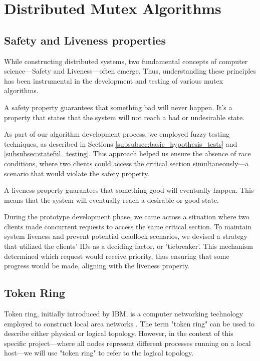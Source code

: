 \chapter{\centering Distributed Mutex Algorithms}
\label{chap:algorithms}

\section{Safety and Liveness properties}
While constructing distributed systems, two fundamental concepts of computer science—Safety and Liveness—often emerge. Thus, understanding these principles has been instrumental in the development and testing of various mutex algorithms.


A safety property guarantees that something bad will never happen. It's a 
property that states that the system will not reach a bad or undesirable state. 

As part of our algorithm development process, we employed fuzzy testing techniques, as described in Sections \ref{subsubsec:basic_hypothesis_tests} and \ref{subsubsec:stateful_testing}. This approach helped us ensure the absence of race conditions, where two clients could access the critical section simultaneously—a scenario that would violate the safety property.

A liveness property guarantees that something good will eventually happen. 
This means that the system will eventually reach a desirable or good state.

During the prototype development phase, we came across a situation where two clients made concurrent requests to access the same critical section. To maintain system liveness and prevent potential deadlock scenarios, we devised a strategy that utilized the clients' IDs as a deciding factor, or 'tiebreaker'. This mechanism determined which request would receive priority, thus ensuring that some progress would be made, aligning with the liveness property.

\section{Token Ring}
Token ring, initially introduced by IBM, is a computer networking technology 
employed to construct local area networks \cite{wiki_token_ring}. The term "token ring" 
can be used to describe either physical or logical topology. However, in the 
context of this specific project—where all nodes represent different processes 
running on a local host—we will use "token ring" to refer to the logical topology.

